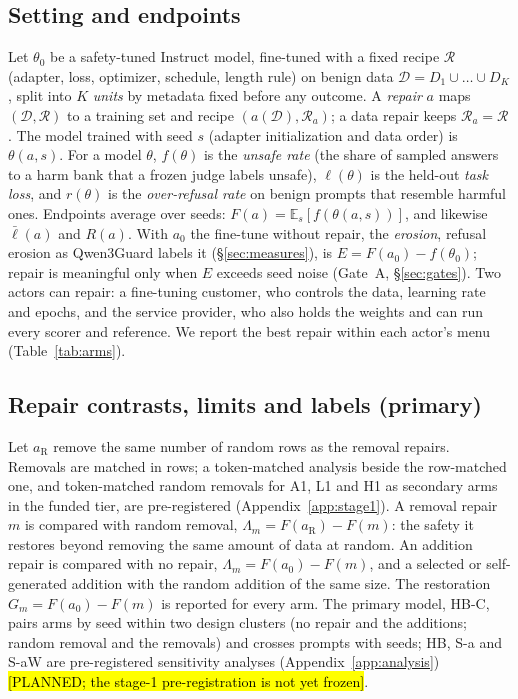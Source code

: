 \documentclass{article}
\theoremstyle{plain}
\theoremstyle{definition}
\theoremstyle{remark}
\newcommand{\ph}[1]{\hl{#1}}
\begin{document}
\subsection{Setting and endpoints}
\label{sec:endpoints}

Let $\theta_0$ be a safety-tuned Instruct model, fine-tuned with a fixed recipe
$\mathcal{R}$ (adapter, loss, optimizer, schedule, length rule) on benign data
$\mathcal{D} = D_1 \cup \dots \cup D_K$, split into $K$ \emph{units} by
metadata fixed before any outcome. A \emph{repair} $a$ maps
$(\mathcal{D}, \mathcal{R})$ to a training set and recipe
$(a(\mathcal{D}), \mathcal{R}_a)$; a data repair keeps
$\mathcal{R}_a = \mathcal{R}$. The model trained with seed $s$ (adapter
initialization and data order) is $\theta(a,s)$. For a model $\theta$,
$f(\theta)$ is the \emph{unsafe rate} (the share of sampled answers to a harm
bank that a frozen judge labels unsafe), $\ell(\theta)$ is the held-out
\emph{task loss}, and $r(\theta)$ is the \emph{over-refusal rate} on benign
prompts that resemble harmful ones. Endpoints average over seeds:
$F(a) = \mathbb{E}_s[f(\theta(a,s))]$, and likewise $\bar\ell(a)$ and $R(a)$.
With $a_0$ the fine-tune without repair, the \emph{erosion}, refusal erosion as
Qwen3Guard labels it (\S\ref{sec:measures}), is $E = F(a_0) - f(\theta_0)$;
repair is meaningful only when $E$ exceeds seed noise (Gate~A,
\S\ref{sec:gates}). Two actors can repair: a fine-tuning customer, who controls the data, learning rate and epochs, and the
service provider, who also holds the weights and can run every scorer and
reference. We report the best repair within each actor's menu
(Table~\ref{tab:arms}).

\subsection{Repair contrasts, limits and labels (primary)}
\label{sec:contrasts}

Let $a_{\mathrm{R}}$ remove the same number of random rows as the removal
repairs. Removals are matched in rows; a token-matched analysis beside the
row-matched one, and token-matched random removals for A1, L1 and H1 as
secondary arms in the funded tier, are pre-registered
(Appendix~\ref{app:stage1}). A removal repair $m$ is compared with random removal,
$\Lambda_m = F(a_{\mathrm{R}}) - F(m)$: the safety it restores beyond removing
the same amount of data at random. An addition repair is compared with no
repair, $\Lambda_m = F(a_0) - F(m)$, and a selected or self-generated addition
with the random addition of the same size. The restoration
$G_m = F(a_0) - F(m)$ is reported for every arm. The primary model, HB-C,
pairs arms by seed within two design clusters (no repair and the additions;
random removal and the removals) and crosses prompts with seeds; HB, S-a and S-aW are pre-registered sensitivity analyses
(Appendix~\ref{app:analysis}) \ph{[PLANNED; the stage-1 pre-registration is not yet frozen]}.
\end{document}
